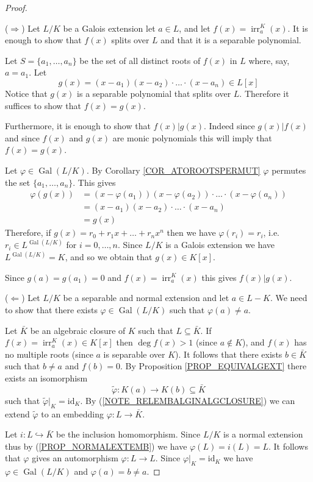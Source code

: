 \documentclass[12pt, letterpaper, oneside]{article}
\theoremstyle{plain}
\theoremstyle{definition}
\newcommand{\hra}{\hookrightarrow}
\newcommand{\id}{\mathrm{id}}
\newcommand{\irr}{\operatorname{irr}}
\newcommand{\Gal}{\operatorname{Gal}}
\newcommand{\vs}{\vskip 5mm}
\begin{document}
\begin{proof} \ 

($\Rightarrow$) Let $L/K$ be a Galois extension let $a\in L$, and let $f(x) = \irr^{K}_{a}(x)$. 
It is enough to show that $f(x)$ splits over $L$ and that it is a separable polynomial. 

Let $S= \{a_{1}, \dots, a_{n}\}$ be the set of all distinct roots of $f(x)$ in $L$ where, say, 
$a=a_{1}$. Let 
$$g(x) = (x-a_{1})(x-a_{2})\cdot{\dots}\cdot(x-a_{n}) \in L[x]$$
Notice that $g(x)$ is a separable polynomial that splits over $L$. Therefore it suffices to show
that  $f(x)=g(x)$.

Furthermore, it is enough to show that $f(x)|g(x)$. Indeed since  $g(x)| f(x)$ and since  $f(x)$ and $g(x)$
are monic polynomials this will imply that  $f(x)=g(x)$. 

Let $\varphi\in \Gal(L/K)$. By Corollary \ref{COR_ATOROOTSPERMUT} $\varphi$
permutes the set $\{a_{1}, \dots, a_{n}\}$. This gives 
\begin{align*}
\varphi(g(x)) & =  (x-\varphi(a_{1}))(x-\varphi(a_{2}))\cdot{\dots}\cdot(x-\varphi(a_{n})) \\
& = (x-a_{1})(x-a_{2})\cdot{\dots}\cdot(x-a_{n})  \\
& = g(x) 
\end{align*}
Therefore, if $g(x) = r_{0} + r_{1}x + \dots + r_{n}x^{n}$ then we have $\varphi(r_{i}) = r_{i}$, 
i.e.  $r_{i} \in L^{\Gal(L/K)}$ for $i=0, \dots, n$.  Since $L/K$ is a Galois extension 
we have $L^{\Gal(L/K)} = K$, and so we obtain that  $g(x)\in K[x]$. 

Since $g(a) = g(a_{1})=0$ and $f(x)=\irr^{K}_{a}(x)$ this gives  $f(x)|g(x)$.


\vs


($\Leftarrow$)  Let $L/K$ be a separable and normal extension and let $a\in L-K$. 
We need to show that there exists $\varphi\in \Gal(L/K)$ such that $\varphi(a) \neq a$. 

Let $\bar{K}$ be an algebraic closure of $K$ such that $L\subseteq \bar{K}$. 
If $f(x) = \irr^{K}_{a}(x) \in K[x]$ then  $\deg f(x) > 1$ (since $a\not\in K$), and $f(x)$ has 
no multiple roots (since $a$ is separable over $K$). It follows that there exists 
$b\in \bar{K}$ such that $b\neq a$ and $f(b) =0$. By Proposition  \ref{PROP_EQUIVALGEXT}
there exists an isomorphism 
$$\tilde \varphi\colon K(a)\to K(b)\subseteq \bar{K}$$  
such that $\tilde\varphi|_{K} = \id_{K}$. By (\ref{NOTE_RELEMBALGINALGCLOSURE}) we can 
extend $\tilde\varphi$ to an embedding $\varphi\colon L \to \bar{K}$.

Let $i\colon L \hra \bar{K}$ be the inclusion homomorphism. Since $L/K$ is a normal extension 
thus by (\ref{PROP_NORMALEXTEMB}) we have $\varphi(L) = i(L) = L$. It follows that 
$\varphi$ gives an automorphism $\varphi\colon L \to L$. Since $\varphi|_{K} = \id_{K}$
we have $\varphi\in \Gal(L/K)$ and $\varphi(a) = b \neq a$.  

\end{proof}
\end{document}
